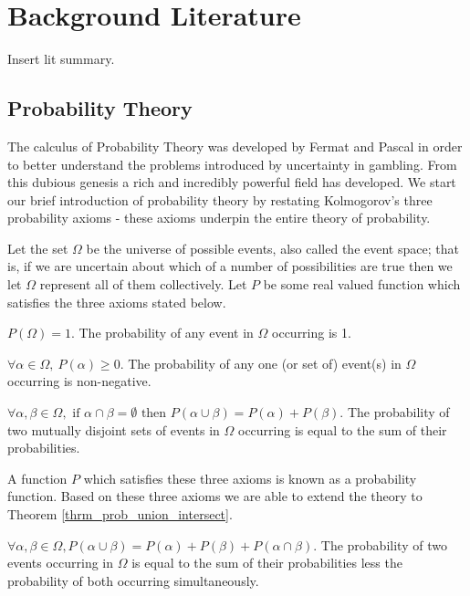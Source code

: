 \documentclass[../masters.tex]{subfiles}
\begin{document}
\graphicspath{{./imgs/}{../imgs/}} %

\section{Background Literature}
Insert lit summary.

\subsection{Probability Theory}
The calculus of Probability Theory was developed by Fermat and Pascal in order to better understand the problems introduced by uncertainty in gambling. From this dubious genesis a rich and incredibly powerful field has developed. We start our brief introduction of probability theory by restating Kolmogorov's three probability axioms - these axioms underpin the entire theory of probability.

Let the set $\Omega$ be the universe of possible events, also called the event space; that is, if we are uncertain about which of a number of possibilities are true then we let $\Omega$ represent all of them collectively. Let $P$ be some real valued function which satisfies the three axioms stated below.
\begin{ax}
$P(\Omega) = 1$. The probability of any event in $\Omega$ occurring is 1.
\end{ax}
\begin{ax}
$\forall \alpha \in \Omega,~P(\alpha) \geq 0$. The probability of any one (or set of) event(s) in $\Omega$ occurring is non-negative. 
\end{ax}
\begin{ax}
$\forall \alpha, \beta \in \Omega,\text{ if } \alpha \cap \beta = \emptyset \text{ then } P(\alpha \cup \beta) = P(\alpha) + P(\beta)$. The probability of two mutually disjoint sets of events in $\Omega$ occurring is equal to the sum of their probabilities.
\end{ax}
A function $P$ which satisfies these three axioms is known as a probability function. Based on these three axioms we are able to extend the theory to Theorem \ref{thrm_prob_union_intersect}.
\begin{thrm}
$\forall \alpha, \beta \in \Omega, P(\alpha \cup \beta) = P(\alpha) + P(\beta) + P(\alpha \cap \beta)$. The probability of two events occurring in $\Omega$ is equal to the sum of their probabilities less the probability of both occurring simultaneously.
\label{thrm_prob_union_intersect}
\end{thrm}
\end{document}
